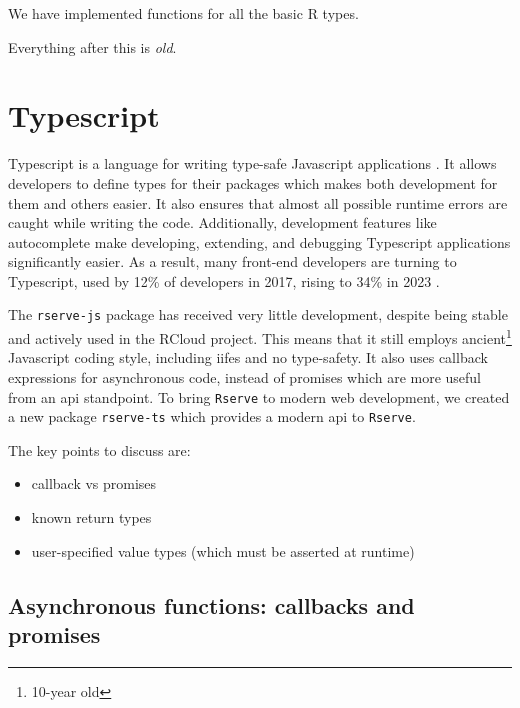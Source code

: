 \documentclass{article}
\newcommand{\pkg}[1]{\texttt{#1}}
\newcommand{\prog}[1]{{\sf #1}}
\newcommand{\proglang}[1]{\prog{#1}}
\newcommand{\R}{\prog{R}}
\begin{document}
We have implemented functions for all the basic \R{} types.

\pagebreak

Everything after this is \emph{old}.

\section{Typescript}

Typescript is a language for writing type-safe Javascript applications \parencite{Bierman2014}.
It allows developers to define types for their packages which makes both development for them and others easier.
It also ensures that almost all possible runtime errors are caught while writing the code.
Additionally, development features like autocomplete make developing, extending, and debugging Typescript applications significantly easier.
As a result, many front-end developers are turning to Typescript, used by 12\% of developers in 2017, rising to 34\% in 2023 \parencite{JetBrains2023}.

The \pkg{rserve-js} package has received very little development, despite being stable and actively used in the \proglang{RCloud} project.
This means that it still employs ancient\footnote{10-year old} Javascript coding style, including \glspl{iife} and no type-safety.
It also uses callback expressions for asynchronous code, instead of promises which are more useful from an \gls{api} standpoint.
To bring \pkg{Rserve} to modern web development, we created a new package \pkg{rserve-ts} which provides a modern \gls{api} to \pkg{Rserve}.

The key points to discuss are:
\begin{itemize}
    \item callback vs promises
    \item known return types
    \item user-specified value types (which must be asserted at runtime)
\end{itemize}

\subsection{Asynchronous functions: callbacks and promises}
\label{sec:async}
\end{document}
